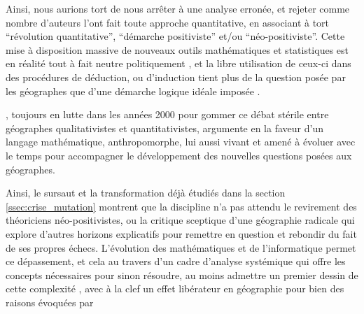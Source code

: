 Ainsi, nous aurions tort de nous arrêter à une analyse erronée, et rejeter comme nombre d'auteurs l'ont fait toute approche quantitative, en associant à tort \enquote{révolution quantitative}, \enquote{démarche positiviste} et/ou \enquote{néo-positiviste}. Cette mise à disposition massive de nouveaux outils mathématiques et statistiques est en réalité tout à fait neutre politiquement \autocite{Sheppard2001}, et la libre utilisation de ceux-ci dans des procédures de déduction, ou d'induction tient plus de la question posée par les géographes que d'une démarche logique idéale imposée \autocite{Sanders2000}.


\textcite{Sheppard2001}, toujours en lutte dans les années 2000 pour gommer ce débat stérile entre géographes qualitativistes et quantitativistes, argumente en la faveur d'un langage mathématique, anthropomorphe, lui aussi vivant et amené à évoluer avec le temps pour accompagner le développement des nouvelles questions posées aux géographes.


Ainsi, le sursaut et la transformation déjà étudiés dans la section \ref{ssec:crise_mutation} montrent que la discipline n'a pas attendu le revirement des théoriciens néo-positivistes, ou la critique sceptique d'une géographie radicale qui explore d'autres horizons explicatifs pour remettre en question et rebondir du fait de ses propres échecs. L'évolution des mathématiques et de l'informatique permet ce dépassement, et cela au travers d'un cadre d'analyse systémique qui offre les concepts nécessaires pour sinon résoudre, au moins admettre un premier dessin de cette complexité \autocite{Dauphine2003}, avec à la clef un effet libérateur en géographie pour bien des raisons évoquées par \textcites[137]{Pumain2002}[27-28]{Pumain2003}

